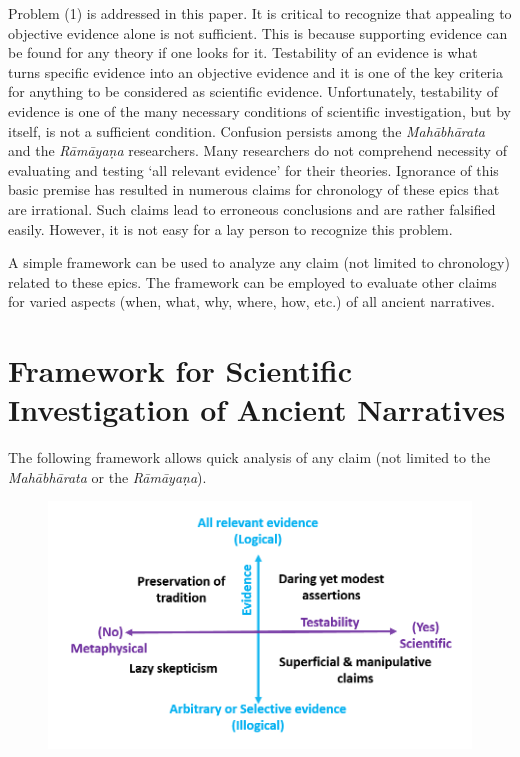 Problem (1) is addressed in this paper. It is critical to recognize that appealing to objective evidence alone is not sufficient. This is because supporting evidence can be found for any theory if one looks for it. Testability of an evidence is what turns specific evidence into an objective evidence and it is one of the key criteria for anything to be considered as scientific evidence. Unfortunately, testability of evidence is one of the many necessary conditions of scientific investigation, but by itself, is not a sufficient condition. Confusion persists among the \textit{Mahābhārata} and the \textit{Rāmāyaṇa} researchers. Many researchers do not comprehend necessity of evaluating and testing ‘all relevant evidence’ for their theories. Ignorance of this basic premise has resulted in numerous claims for chronology of these epics that are irrational. Such claims lead to erroneous conclusions and are rather falsified easily. However, it is not easy for a lay person to recognize this problem.

A simple framework can be used to analyze any claim (not limited to chronology) related to these epics. The framework can be employed to evaluate other claims for varied aspects (when, what, why, where, how, etc.) of all ancient narratives.


\section*{Framework for Scientific Investigation of Ancient Narratives}

The following framework allows quick analysis of any claim (not limited to the \textit{Mahābhārata} or the \textit{Rāmāyaṇa}).
\begin{figure}[H]
\includegraphics[scale=.3]{images/chap2-2.jpg}
\caption{}
\end{figure}


